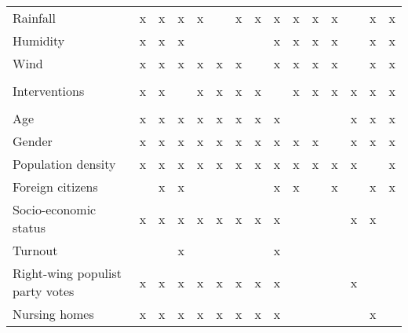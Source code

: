 \documentclass[10pt,letterpaper]{article}
\providecommand{\DIFaddend}{} %
\DeclareRobustCommand{\DIFaddend}{\DIFOaddend \let\includegraphics\DIFOincludegraphics} %
\begin{document}
\begin{table}[!ht]
\begin{adjustwidth}{-2.25in}{0in}
\begin{tabular}[t]{lllllllllllllll}
\hspace{1em}Rainfall & x & x & x & x &  & x & x & x & x & x & x &  & x & x\\
\hspace{1em}Humidity & x & x & x &  &  &  &  & x & x & x & x &  & x & x\\
\hspace{1em}Wind & x & x & x & x & x & x &  & x & x & x & x &  & x & x\\
\addlinespace[0.3em]
\multicolumn{15}{l}{\textbf{Interventions}}\\
\hspace{1em}Interventions & x & x &  & x & x & x & x &  & x & x & x & x & x & x\\
\addlinespace[0.3em]
\multicolumn{15}{l}{\textbf{Socio-demographic}}\\
\hspace{1em}Age & x & x & x & x & x & x & x & x &  &  &  & x & x & x\\
\hspace{1em}Gender & x & x & x & x & x & x & x & x & x & x &  & x & x & x\\
\hspace{1em}Population density & x & x & x & x & x & x & x & x & x & x & x & x &  & x\\
\hspace{1em}Foreign citizens &  & x & x &  &  &  &  & x & x &  & x &  & x & x\\
\hspace{1em}Socio-economic status & x & x & x & x & x & x & x & x &  &  &  & x & x & \\
\hspace{1em}Turnout &  &  & x &  &  &  &  & x &  &  &  &  &  & \\
\hspace{1em}Right-wing populist party votes & x & x & x & x & x & x & x & x &  &  &  & x &  & \\
\hspace{1em}Nursing homes & x & x & x & x & x & x & x & x &  &  &  &  & x & \\
\bottomrule
\end{tabular}
\label{tab:adjsets}
\end{adjustwidth}
\end{table}
\DIFaddend 

\end{document}

